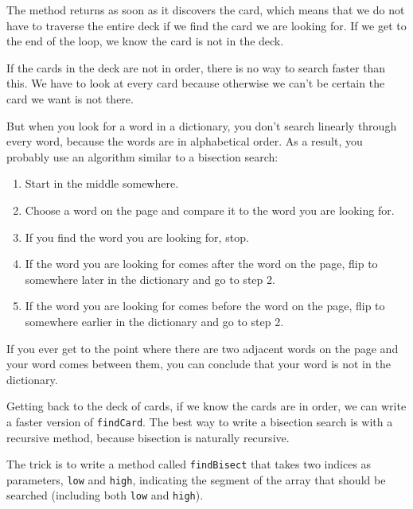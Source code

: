 \documentclass[12pt]{book}
\theoremstyle{exercise}
\begin{document}
The method returns as soon as it discovers
the card, which means that we do not have to traverse the entire
deck if we find the card we are looking for.  If we get to the end
of the loop, we know the card is not in the deck.

If the cards in the deck are not in order, there is no way to search
faster than this.  We have to look at every card because
otherwise we can't be certain the card we want is not
there.


But when you look for a word in a dictionary, you don't search
linearly through every word, because the words are in
alphabetical order.  As a result, you probably use an algorithm
similar to a bisection search:

\begin {enumerate}

\item Start in the middle somewhere.

\item Choose a word on the page and compare it to the word you
are looking for.

\item If you find the word you are looking for, stop.

\item If the word you are looking for comes after the word on
the page, flip to somewhere later in the dictionary and go to
step 2.

\item If the word you are looking for comes before the word on
the page, flip to somewhere earlier in the dictionary and go to
step 2.

\end {enumerate}

If you ever get to the point where there are two adjacent words on the
page and your word comes between them, you can conclude that your word
is not in the dictionary.

Getting back to the deck of cards, if we know the cards are in order,
we can write a faster version of {\tt findCard}.  The best way to
write a bisection search is with a recursive method, because bisection
is naturally recursive.  

The trick is to write a method called {\tt findBisect} that takes
two indices as parameters, {\tt low} and {\tt high}, indicating the
segment of the array that should be searched (including both
{\tt low} and {\tt high}).
\end{document}

